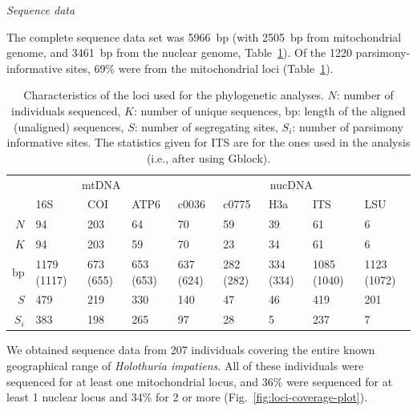 \documentclass[12pt,letterpaper]{article}\usepackage[]{graphicx}\usepackage[]{color}
\renewcommand{\subsection}[1]{%
\bigskip
\begin{center}
\begin{large}
\normalfont\itshape #1
\end{large}
\end{center}}
\begin{document}
\subsection{Sequence data}




The complete sequence data set was 5966~bp (with
2505~bp from mitochondrial
genome, and 3461~bp from the nuclear genome,
Table~\ref{tab:loci-characteristics}). Of the 1220
parsimony-informative sites, 69\% were from the mitochondrial loci
(Table~\ref{tab:loci-characteristics}).


\begin{table}[ht]
\centering
\caption{Characteristics of the loci used for the phylogenetic analyses. $N$: number of individuals sequenced, $K$: number of unique sequences, bp: length of the aligned (unaligned) sequences, $S$: number of segregating sites, $S_{i}$: number of parsimony informative sites. The statistics given for ITS are for the ones used in the analysis (i.e., after using Gblock).} 
\label{tab:loci-characteristics}
\begin{tabular}{rllllllll}
 & \multicolumn{3}{c}{mtDNA} & \multicolumn{5}{|c}{nucDNA} \\ 
\cline{2-4} \cline{5-9}
 & 16S & COI & ATP6 & c0036 & c0775 & H3a & ITS & LSU \\ 
  \hline
$N$ & 94 & 203 & 64 & 70 & 59 & 39 & 61 & 6 \\ 
  $K$ & 94 & 203 & 59 & 70 & 23 & 34 & 61 & 6 \\ 
  bp & 1179 (1117) & 673 (655) & 653 (653) & 637 (624) & 282 (282) & 334 (334) & 1085 (1040) & 1123 (1072) \\ 
  $S$ & 479 & 219 & 330 & 140 & 47 & 46 & 419 & 201 \\ 
  $S_{i}$ & 383 & 198 & 265 & 97 & 28 & 5 & 237 & 7 \\ 
   \hline
\end{tabular}
\end{table}



We obtained sequence data from 207 individuals covering the entire known geographical
range of \textit{Holothuria impatiens}. All of these individuals were
sequenced for at least one mitochondrial locus, and
36\% were
sequenced for at least 1 nuclear locus and
34\% for 2 or more
(Fig.~\ref{fig:loci-coverage-plot}).

\end{document}
